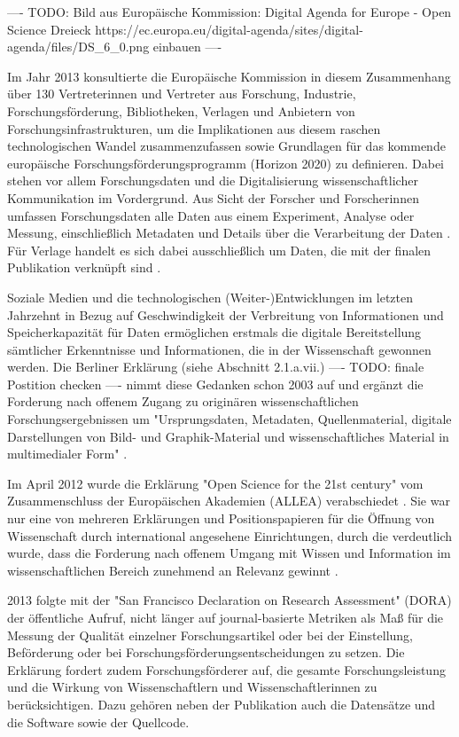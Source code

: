 ---- TODO: Bild aus Europäische Kommission: Digital Agenda for Europe - Open Science Dreieck https://ec.europa.eu/digital-agenda/sites/digital-agenda/files/DS_6_0.png einbauen ----

Im Jahr 2013 konsultierte die Europäische Kommission in diesem Zusammenhang über 130 Vertreterinnen und Vertreter aus Forschung, Industrie, Forschungsförderung, Bibliotheken, Verlagen und Anbietern von Forschungsinfrastrukturen, um die Implikationen aus diesem raschen technologischen Wandel zusammenzufassen sowie Grundlagen für das kommende europäische Forschungsförderungsprogramm (Horizon 2020) zu definieren. Dabei stehen vor allem Forschungsdaten und die Digitalisierung wissenschaftlicher Kommunikation im Vordergrund. Aus Sicht der Forscher und Forscherinnen umfassen Forschungsdaten alle Daten aus einem Experiment, Analyse oder Messung, einschließlich Metadaten und Details über die Verarbeitung der Daten \cite{eu_consult_data_2013}. Für Verlage handelt es sich dabei ausschließlich um Daten, die mit der finalen Publikation verknüpft sind \cite{eu_consult_data_2013}.

Soziale Medien und die technologischen (Weiter-)Entwicklungen im letzten Jahrzehnt in Bezug auf Geschwindigkeit der Verbreitung von Informationen und Speicherkapazität für Daten ermöglichen erstmals die digitale Bereitstellung sämtlicher Erkenntnisse und Informationen, die in der Wissenschaft gewonnen werden. Die Berliner Erklärung (siehe Abschnitt 2.1.a.vii.) ---- TODO: finale Postition checken ---- nimmt diese Gedanken schon 2003 auf und ergänzt die Forderung nach offenem Zugang zu originären wissenschaftlichen Forschungsergebnissen um "Ursprungsdaten, Metadaten, Quellenmaterial, digitale Darstellungen von Bild- und Graphik-Material und wissenschaftliches Material in multimedialer Form" \cite{berliner_erklaerung_2003}.

Im April 2012 wurde die Erklärung "Open Science for the 21st century" vom Zusammenschluss der Europäischen Akademien (ALLEA) verabschiedet \cite{ALLEA_2012}. Sie war nur eine von mehreren Erklärungen und Positionspapieren für die Öffnung von Wissenschaft durch international angesehene Einrichtungen, durch die verdeutlich wurde, dass die Forderung nach offenem Umgang mit Wissen und Information im wissenschaftlichen Bereich zunehmend an Relevanz gewinnt \cite{schulze_2013_open}.

2013 folgte mit der "San Francisco Declaration on Research Assessment" (DORA) \cite{DORA_2013} der öffentliche Aufruf, nicht länger auf journal-basierte Metriken als Maß für die Messung der Qualität einzelner Forschungsartikel oder bei der Einstellung, Beförderung oder bei Forschungsförderungsentscheidungen zu setzen. Die Erklärung fordert zudem Forschungsförderer auf, die gesamte Forschungsleistung und die Wirkung von Wissenschaftlern und Wissenschaftlerinnen zu berücksichtigen. Dazu gehören neben der Publikation auch die Datensätze und die Software sowie der Quellcode.


